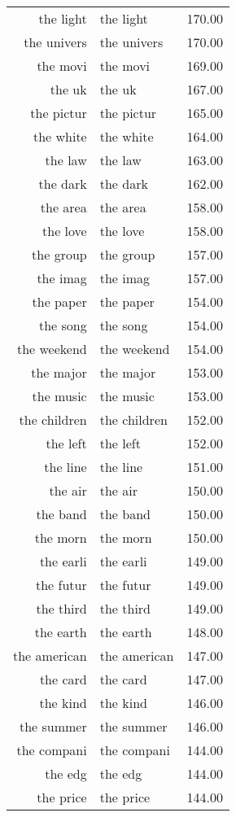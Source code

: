 \begin{table}[ht]
\begin{tabular}{rlr}
  the light & the light & 170.00 \\ 
  the univers & the univers & 170.00 \\ 
  the movi & the movi & 169.00 \\ 
  the uk & the uk & 167.00 \\ 
  the pictur & the pictur & 165.00 \\ 
  the white & the white & 164.00 \\ 
  the law & the law & 163.00 \\ 
  the dark & the dark & 162.00 \\ 
  the area & the area & 158.00 \\ 
  the love & the love & 158.00 \\ 
  the group & the group & 157.00 \\ 
  the imag & the imag & 157.00 \\ 
  the paper & the paper & 154.00 \\ 
  the song & the song & 154.00 \\ 
  the weekend & the weekend & 154.00 \\ 
  the major & the major & 153.00 \\ 
  the music & the music & 153.00 \\ 
  the children & the children & 152.00 \\ 
  the left & the left & 152.00 \\ 
  the line & the line & 151.00 \\ 
  the air & the air & 150.00 \\ 
  the band & the band & 150.00 \\ 
  the morn & the morn & 150.00 \\ 
  the earli & the earli & 149.00 \\ 
  the futur & the futur & 149.00 \\ 
  the third & the third & 149.00 \\ 
  the earth & the earth & 148.00 \\ 
  the american & the american & 147.00 \\ 
  the card & the card & 147.00 \\ 
  the kind & the kind & 146.00 \\ 
  the summer & the summer & 146.00 \\ 
  the compani & the compani & 144.00 \\ 
  the edg & the edg & 144.00 \\ 
  the price & the price & 144.00 \\ 

\end{tabular}
\end{table}
